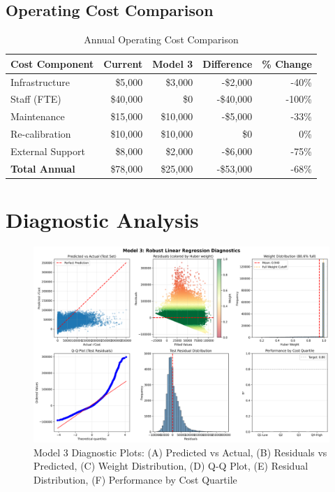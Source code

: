 \subsection{Operating Cost Comparison}

\begin{table}[h]
\centering
\caption{Annual Operating Cost Comparison}
\begin{tabular}{lrrrr}
\toprule
\textbf{Cost Component} & \textbf{Current} & \textbf{Model 3} & \textbf{Difference} & \textbf{\% Change} \\
\midrule
Infrastructure & \$5,000 & \$3,000 & -\$2,000 & -40\% \\
Staff (FTE) & \$40,000 & \$0 & -\$40,000 & -100\% \\
Maintenance & \$15,000 & \$10,000 & -\$5,000 & -33\% \\
Re-calibration & \$10,000 & \$10,000 & \$0 & 0\% \\
External Support & \$8,000 & \$2,000 & -\$6,000 & -75\% \\
\midrule
\textbf{Total Annual} & \$78,000 & \$25,000 & -\$53,000 & -68\% \\
\bottomrule
\end{tabular}
\end{table}

\section{Diagnostic Analysis}

\begin{figure}[h!]
\centering
\includegraphics[width=\textwidth]{models/model_3/diagnostic_plots.png}
\caption{Model 3 Diagnostic Plots: (A) Predicted vs Actual, (B) Residuals vs Predicted, (C) Weight Distribution, (D) Q-Q Plot, (E) Residual Distribution, (F) Performance by Cost Quartile}
\label{fig:model3_diagnostics}
\end{figure}

